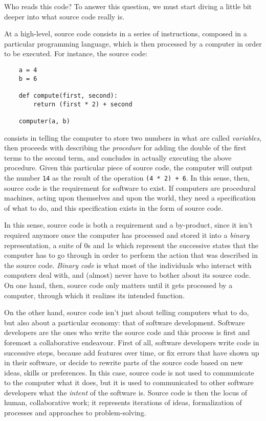 Who reads this code? To answer this question, we must start diving a little bit deeper into what source code really is.

At a high-level, source code consists in a series of instructions, composed in a particular programming language, which is then processed by a computer in order to be executed. For instance, the source code:

\begin{lstlisting}
    a = 4
    b = 6

    def compute(first, second):
        return (first * 2) + second
    
    computer(a, b)
\end{lstlisting}

consists in telling the computer to store two numbers in what are called \emph{variables}, then proceeds with describing the \emph{procedure} for adding the double of the first terms to the second term, and concludes in actually executing the above procedure. Given this particular piece of source code, the computer will output the number \lstinline{14} as the result of the operation \lstinline{(4 * 2) + 6}. In this sense, then, source code is the requirement for software to exist. If computers are procedural machines, acting upon themselves and upon the world, they need a specification of what to do, and this specification exists in the form of source code.

In this sense, source code is both a requirement and a by-product, since it isn't required anymore once the computer has processed and stored it into a \emph{binary} representation, a suite of 0s and 1s which represent the successive states that the computer has to go through in order to perform the action that was described in the source code. \emph{Binary code} is what most of the individuals who interact with computers deal with, and (almost) never have to bother about its source code. On one hand, then, source code only matters until it gets processed by a computer, through which it realizes its intended function.

On the other hand, source code isn't just about telling computers what to do, but also about a particular economy: that of software development. Software developers are the ones who write the source code and this process is first and foremost a collaborative endeavour. First of all, software developers write code in successive steps, because add features over time, or fix errors that have shown up in their software, or decide to rewrite parts of the source code based on new ideas, skills or preferences. In this case, source code is not used to communicate to the computer what it does, but it is used to communicated to other software developers what the \emph{intent} of the software is. Source code is then the locus of human, collaborative work; it represents iterations of ideas, formalization of processes and approaches to problem-solving.

